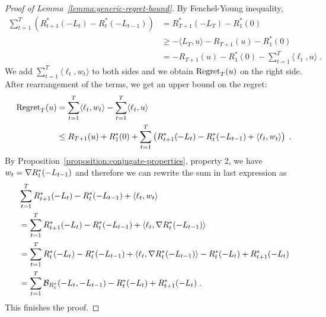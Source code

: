\begin{proof}[Proof of Lemma~\ref{lemma:generic-regret-bound}]
By Fenchel-Young inequality,
\begin{align*}
\sum_{t=1}^T \left( R_{t+1}^*(-L_t) - R_t^*(-L_{t-1}) \right)
& = R_{T+1}^*(-L_T) - R_1^*(0) \\
& \ge - \langle L_T, u \rangle - R_{T+1}(u)  - R_1^*(0) \\
& = - R_{T+1}(u)  - R_1^*(0) - \sum_{t=1}^T \langle \ell_t, u \rangle \; .
\end{align*}
We add $\sum_{t=1}^T \langle \ell_t, w_t \rangle$ to both sides and we obtain
$\operatorname{Regret}_T(u)$ on the right side. After rearrangement of the terms, we get an upper bound
on the regret:
\begin{align*}
\operatorname{Regret}_T(u)
& = \sum_{t=1}^T \langle \ell_t, w_t \rangle - \sum_{t=1}^T \langle \ell_t, u \rangle \\
& \le R_{T+1}(u) + R_1^*(0) + \sum_{t=1}^T \left( R_{t+1}^*(-L_t) - R_t^*(-L_{t-1}) + \langle \ell_t, w_t \rangle \right) \; .
\end{align*}
By Proposition~\ref{proposition:conjugate-properties}, property 2, we have $w_t =
\nabla R_t^*(-L_{t-1})$ and therefore we can rewrite the sum in last expression as
\begin{align*}
& \sum_{t=1}^T R_{t+1}^*(-L_t) - R_t^*(-L_{t-1}) + \langle \ell_t, w_t \rangle \\
& = \sum_{t=1}^T R_{t+1}^*(-L_t) - R_t^*(-L_{t-1}) + \langle \ell_t, \nabla R_t^*(-L_{t-1}) \rangle \\
& = \sum_{t=1}^T R_t^*(-L_t) - R_t^*(-L_{t-1}) + \langle \ell_t, \nabla R_t^*(-L_{t-1}) \rangle - R_t^*(-L_t) + R_{t+1}^*(-L_t) \\
& = \sum_{t=1}^T \mathcal{B}_{R_t^*}(-L_t, -L_{t-1}) - R_t^*(-L_t) + R_{t+1}^*(-L_t) \; .
\end{align*}
This finishes the proof.
\end{proof}

